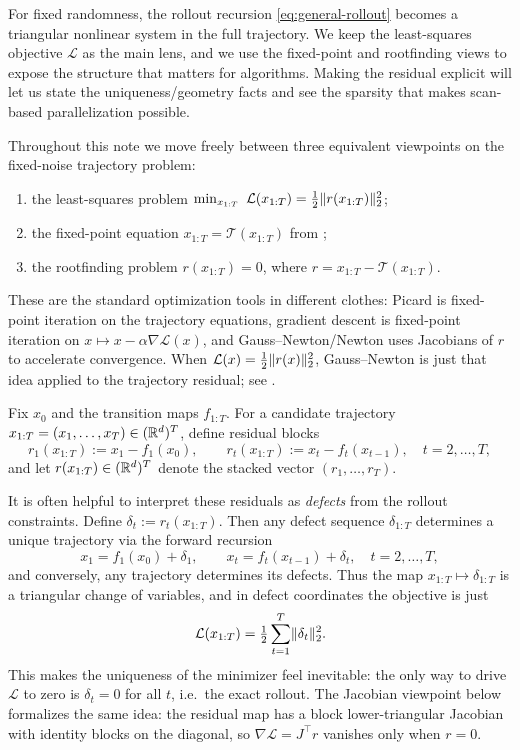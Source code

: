 \documentclass[11pt]{article}
\begin{document}
For fixed randomness, the rollout recursion \eqref{eq:general-rollout} becomes a triangular nonlinear system in the full trajectory.
We keep the least-squares objective $\mathcal{L}$ as the main lens, and we use the fixed-point and rootfinding views to expose the structure that matters for algorithms.
Making the residual explicit will let us state the uniqueness/geometry facts and see the sparsity that makes scan-based parallelization possible.

Throughout this note we move freely between three equivalent viewpoints on the fixed-noise trajectory problem:
\begin{enumerate}[leftmargin=*]
  \item the least-squares problem $\min_{x_{1:T}}\ \mathcal{L}(x_{1:T})=\tfrac12\norm{r(x_{1:T})}_2^2$;
  \item the fixed-point equation $x_{1:T}=\mathcal{T}(x_{1:T})$ from ;
  \item the rootfinding problem $r(x_{1:T})=0$, where $r=x_{1:T}-\mathcal{T}(x_{1:T})$.
\end{enumerate}
These are the standard optimization tools in different clothes: Picard is fixed-point iteration on the trajectory equations, gradient descent is fixed-point iteration on $x\mapsto x-\alpha\nabla\mathcal{L}(x)$, and Gauss--Newton/Newton uses Jacobians of $r$ to accelerate convergence.
When $\mathcal{L}(x)=\tfrac12\lVert r(x)\rVert_2^2$, Gauss--Newton is just that idea applied to the trajectory residual; see .

\begin{definition}
\label{def:trajectory-residual}
Fix $x_0$ and the transition maps $f_{1:T}$.
For a candidate trajectory $x_{1:T}=(x_1,\dots,x_T) \in (\mathbb{R}^d)^T$, define residual blocks
\begin{equation}
  r_1(x_{1:T}) := x_1 - f_1(x_0),
  \qquad
  r_t(x_{1:T}) := x_t - f_t(x_{t-1}), \quad t=2,\dots,T,
  \label{eq:residual-blocks}
\end{equation}
and let $r(x_{1:T}) \in (\mathbb{R}^d)^T$ denote the stacked vector $(r_1,\dots,r_T)$.
\end{definition}

It is often helpful to interpret these residuals as \emph{defects} from the rollout constraints.
Define $\delta_t := r_t(x_{1:T})$.
Then any defect sequence $\delta_{1:T}$ determines a unique trajectory via the forward recursion
\[
x_1 = f_1(x_0)+\delta_1,\qquad
x_t = f_t(x_{t-1})+\delta_t,\quad t=2,\dots,T,
\]
and conversely, any trajectory determines its defects.
Thus the map $x_{1:T}\mapsto \delta_{1:T}$ is a triangular change of variables, and in defect coordinates the objective is just
\[
  \mathcal{L}(x_{1:T}) = \tfrac12 \sum_{t=1}^T \lVert\delta_t\rVert_2^2.
\]
This makes the uniqueness of the minimizer feel inevitable: the only way to drive $\mathcal{L}$ to zero is $\delta_t=0$ for all $t$, i.e.\ the exact rollout.
The Jacobian viewpoint below formalizes the same idea: the residual map has a block lower-triangular Jacobian with identity blocks on the diagonal, so $\nabla\mathcal{L}=J^\top r$ vanishes only when $r=0$.
\end{document}
